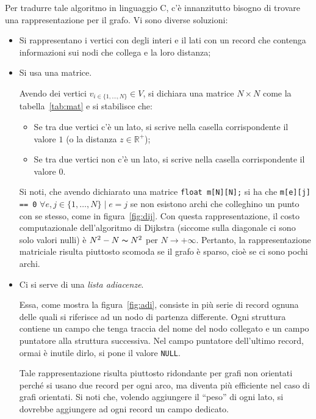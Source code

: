 Per  tradurre tale algoritmo in linguaggio C, c'è innanzitutto bisogno di trovare una rappresentazione per il grafo. Vi sono diverse soluzioni:
\begin{itemize}
	\item
Si rappresentano i vertici con degli interi e il lati con un record che contenga informazioni sui nodi che collega e la loro distanza;
	\item
Si usa una matrice.

Avendo dei vertici $v_{i\in\{1,\dots,N\}}\in V$, si dichiara una matrice $N\times N$ come la tabella~\vref{tab:mat} e si stabilisce che:
	\begin{itemize}
		\item
Se tra due vertici c'è un lato, si scrive nella casella corrispondente il valore $1$ (o la distanza $z\in\mathbb{R^{+}}$);
		\item
Se tra due vertici non c'è un lato, si scrive nella casella corrispondente il valore $0$.
	\end{itemize}
Si noti, che avendo dichiarato una matrice \lstinline!float m[N][N];! si ha che \lstinline!m[e][j] == 0! $\forall e,j\in\{1,\dots,N\}\mid e=j$ se non esistono archi che colleghino un punto con se stesso, come in figura~\ref{fig:dij}. Con questa rappresentazione, il costo computazionale dell'algoritmo di Dijkstra (siccome sulla diagonale ci sono solo valori nulli) è $N^2-N\thicksim N^2$ per $N\to+\infty$. Pertanto, la rappresentazione matriciale risulta piuttosto scomoda se il grafo è sparso, cioè se ci sono pochi archi.
	\item
Ci si serve di una \emph{lista adiacenze}.

Essa, come mostra la figura~\vref{fig:adi}, consiste in più serie di record ognuna delle quali si riferisce ad un nodo di partenza differente. Ogni struttura contiene un campo che tenga traccia del nome del nodo collegato e un campo puntatore alla struttura successiva. Nel campo puntatore dell'ultimo record, ormai è inutile dirlo, si pone il valore \lstinline!NULL!.

Tale rappresentazione risulta piuttosto ridondante per grafi non orientati perché si usano due record per ogni arco, ma diventa più efficiente nel caso di grafi orientati. Si noti che, volendo aggiungere il ``peso'' di ogni lato, si dovrebbe aggiungere ad ogni record un campo dedicato.
\end{itemize}